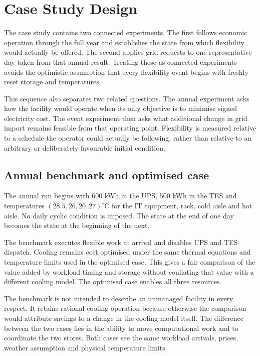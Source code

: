 
\section{Case Study Design}\label{sec:case-study}

The case study contains two connected experiments. The first follows economic
operation through the full year and establishes the state from which flexibility
would actually be offered. The second applies grid requests to one representative
day taken from that annual result. Treating these as connected experiments avoids
the optimistic assumption that every flexibility event begins with freshly
reset storage and temperatures.

This sequence also separates two related questions. The annual experiment asks
how the facility would operate when its only objective is to minimise signed
electricity cost. The event experiment then asks what additional change in grid
import remains feasible from that operating point. Flexibility is measured
relative to a schedule the operator could actually be following, rather
than relative to an arbitrary or deliberately favourable initial condition.

\subsection{Annual benchmark and optimised case}

The annual run begins with 600 kWh in the UPS, 500 kWh in the TES and
temperatures $(28.5,26,20,27)^{\circ}$C for the IT equipment, rack, cold aisle
and hot aisle. No daily cyclic condition is imposed. The state at the end of one
day becomes the state at the beginning of the next.

The benchmark executes flexible work at arrival and disables UPS and TES
dispatch. Cooling remains cost optimised under the same thermal equations and
temperature limits used in the optimised case. This gives a fair comparison of
the value added by workload timing and storage without conflating that value
with a different cooling model. The optimised case enables all three resources.

The benchmark is not intended to describe an unmanaged facility in every
respect. It retains rational cooling operation because otherwise the comparison
would attribute savings to a change in the cooling model itself. The difference
between the two cases lies in the ability to move computational work and to
coordinate the two stores. Both cases see the same workload arrivals, prices,
weather assumption and physical temperature limits.

